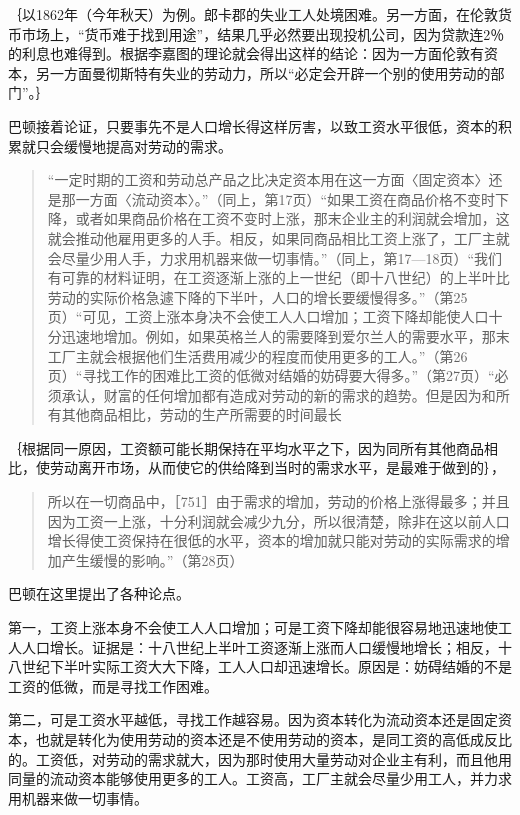 ｛以1862年（今年秋天）为例。郎卡郡的失业工人处境困难。另一方面，在伦敦货币市场上，“货币难于找到用途”，结果几乎必然要出现投机公司，因为贷款连2％的利息也难得到。根据李嘉图的理论就会得出这样的结论：因为一方面伦敦有资本，另一方面曼彻斯特有失业的劳动力，所以“必定会开辟一个别的使用劳动的部门”。｝


巴顿接着论证，只要事先不是人口增长得这样厉害，以致工资水平很低，资本的积累就只会缓慢地提高对劳动的需求。

\begin{quote}{“一定时期的工资和劳动总产品之比决定资本用在这一方面〈固定资本〉还是那一方面〈流动资本〉。”（同上，第17页）“如果工资在商品价格不变时下降，或者如果商品价格在工资不变时上涨，那末企业主的利润就会增加，这就会推动他雇用更多的人手。相反，如果同商品相比工资上涨了，工厂主就会尽量少用人手，力求用机器来做一切事情。”（同上，第17—18页）“我们有可靠的材料证明，在工资逐渐上涨的上一世纪（即十八世纪）的上半叶比劳动的实际价格急遽下降的下半叶，人口的增长要缓慢得多。”（第25页）“可见，工资上涨本身决不会使工人人口增加；工资下降却能使人口十分迅速地增加。例如，如果英格兰人的需要降到爱尔兰人的需要水平，那末工厂主就会根据他们生活费用减少的程度而使用更多的工人。”（第26页）“寻找工作的困难比工资的低微对结婚的妨碍要大得多。”（第27页）“必须承认，财富的任何增加都有造成对劳动的新的需求的趋势。但是因为和所有其他商品相比，劳动的生产所需要的时间最长}\end{quote}

｛根据同一原因，工资额可能长期保持在平均水平之下，因为同所有其他商品相比，使劳动离开市场，从而使它的供给降到当时的需求水平，是最难于做到的｝，

\begin{quote}{所以在一切商品中，［751］由于需求的增加，劳动的价格上涨得最多；并且因为工资一上涨，十分利润就会减少九分，所以很清楚，除非在这以前人口增长得使工资保持在很低的水平，资本的增加就只能对劳动的实际需求的增加产生缓慢的影响。”（第28页）}\end{quote}

巴顿在这里提出了各种论点。

第一，工资上涨本身不会使工人人口增加；可是工资下降却能很容易地迅速地使工人人口增长。证据是：十八世纪上半叶工资逐渐上涨而人口缓慢地增长；相反，十八世纪下半叶实际工资大大下降，工人人口却迅速增长。原因是：妨碍结婚的不是工资的低微，而是寻找工作困难。

第二，可是工资水平越低，寻找工作越容易。因为资本转化为流动资本还是固定资本，也就是转化为使用劳动的资本还是不使用劳动的资本，是同工资的高低成反比的。工资低，对劳动的需求就大，因为那时使用大量劳动对企业主有利，而且他用同量的流动资本能够使用更多的工人。工资高，工厂主就会尽量少用工人，并力求用机器来做一切事情。

